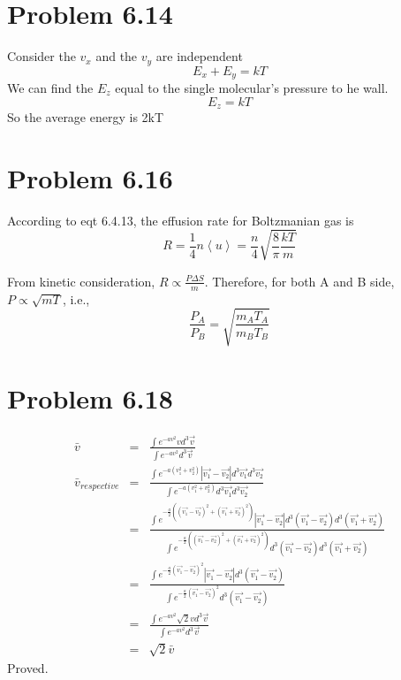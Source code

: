 \documentclass{article}
\begin{document}
\section*{Problem 6.14}
Consider the $v_x$ and the $v_y$ are independent 
$$E_x+E_y=kT$$
We can find the $E_z$ equal to the single molecular's pressure to he wall.
$$E_z=kT$$ 
So the average energy is 2kT


\section*{Problem 6.16} %
\label{sec:problem_6_16}
	According to eqt 6.4.13, the effusion rate for Boltzmanian gas is
	\begin{equation}
		R=\frac{1}{4}n\left< u \right>= \frac{n}{4}\sqrt{\frac{8}{\pi} \frac{kT}{m}}
	\end{equation}

	From kinetic consideration, $ R \propto \frac{P \Delta S}{m} $. Therefore, for both A and B side, $ P \propto \sqrt{mT} $, i.e.,
	\begin{equation}
		\frac{P_A}{P_B}=\sqrt{\frac{m_AT_A}{m_BT_B}}
	\end{equation}
	


\section*{Problem 6.18}
\begin{eqnarray*}
\bar{v}&=&\frac{\int e^{-a v^2}v d^3\vec{v}}{\int e^{-a v^2} d^3\vec{v}}  \\
\bar{v}_{respective}&=&\frac{\int e^{-a (v^2_1+v^2_2)}|\vec{v_1}-\vec{v_2}| d^3\vec{v_1}d^3\vec{v_2}}{\int e^{-a (v^2_1+v^2_2)} d^3\vec{v_1}d^3\vec{v_2}}  \\
&=&\frac{\int e^{-\frac{a}{2} ((\vec{v_1}-\vec{v_2})^2+(\vec{v_1}+\vec{v_2})^2)}|\vec{v_1}-\vec{v_2}| d^3(\vec{v_1}-\vec{v_2})d^3(\vec{v_1}+\vec{v_2})}{\int e^{-\frac{a}{2} ((\vec{v_1}-\vec{v_2})^2+(\vec{v_1}+\vec{v_2})^2)} d^3(\vec{v_1}-\vec{v_2})d^3(\vec{v_1}+\vec{v_2})}  \\
&=&\frac{\int e^{-\frac{a}{2} (\vec{v_1}-\vec{v_2})^2}|\vec{v_1}-\vec{v_2}| d^3(\vec{v_1}-\vec{v_2})}{\int e^{-\frac{a}{2} (\vec{v_1}-\vec{v_2})^2} d^3(\vec{v_1}-\vec{v_2})}  \\
&=&\frac{\int e^{-a v^2}\sqrt{2}v d^3\vec{v}}{\int e^{-a v^2} d^3\vec{v}}  \\
&=&\sqrt{2}\bar{v}
\end{eqnarray*}
Proved.
\end{document}
